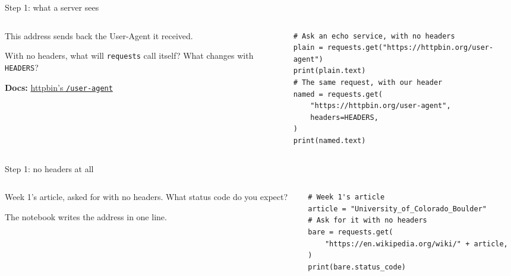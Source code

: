 \documentclass[9pt,aspectratio=169]{beamer}
\begin{document}
\begin{frame}[fragile]{Step 1: what a server sees}
    \begin{columns}[T]
        \begin{column}{0.37\textwidth}
            This address sends back the User-Agent it received.

            \medskip
            With no headers, what will \texttt{requests} call itself? What changes with \texttt{HEADERS}?

            \medskip
            {\scriptsize\textbf{Docs:} \href{https://httpbin.org/\#/Request_inspection/get_user_agent}{httpbin's \texttt{/user-agent}}\par}
        \end{column}
        \begin{column}{0.6\textwidth}
\begin{lstlisting}[basicstyle=\ttfamily\footnotesize]
# Ask an echo service, with no headers
plain = requests.get("https://httpbin.org/user-agent")
print(plain.text)
# The same request, with our header
named = requests.get(
    "https://httpbin.org/user-agent",
    headers=HEADERS,
)
print(named.text)
\end{lstlisting}
        \end{column}
    \end{columns}
\end{frame}

\begin{frame}[fragile]{Step 1: no headers at all}
    \begin{columns}[T]
        \begin{column}{0.37\textwidth}
            Week 1's article, asked for with no headers. What status code do you expect?

            \medskip
            The notebook writes the address in one line.
        \end{column}
        \begin{column}{0.6\textwidth}
\begin{lstlisting}[basicstyle=\ttfamily\footnotesize]
# Week 1's article
article = "University_of_Colorado_Boulder"
# Ask for it with no headers
bare = requests.get(
    "https://en.wikipedia.org/wiki/" + article,
)
print(bare.status_code)
\end{lstlisting}
        \end{column}
    \end{columns}
\end{frame}
\end{document}
